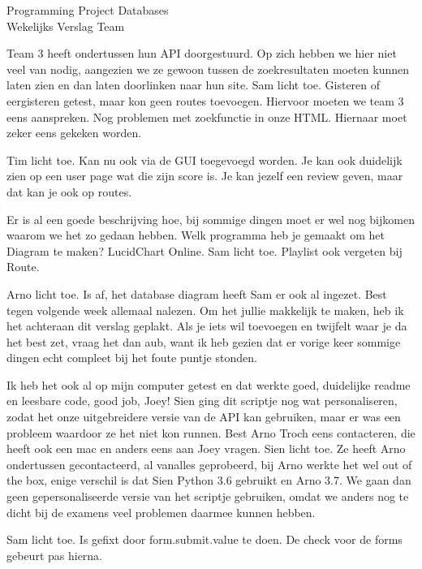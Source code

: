\documentclass{article}
\newcounter{team}
\begin{document}
\begin{Minutes}{Programming Project Databases \\ Wekelijks Verslag Team }

    Team 3 heeft ondertussen hun API doorgestuurd. Op zich hebben we hier niet veel van nodig, aangezien we ze gewoon tussen de zoekresultaten moeten kunnen laten zien en dan laten doorlinken naar hun site. Sam licht toe. Gisteren of eergisteren getest, maar kon geen routes toevoegen. Hiervoor moeten we team 3 eens aanspreken. Nog problemen met zoekfunctie in onze HTML. Hiernaar moet zeker eens gekeken worden.

        Tim licht toe. Kan nu ook via de GUI toegevoegd worden. Je kan ook duidelijk zien op een user page wat die zijn score is. Je kan jezelf een review geven, maar dat kan je ook op routes.

        Er is al een goede beschrijving hoe, bij sommige dingen moet er wel nog bijkomen waarom we het zo gedaan hebben. Welk programma heb je gemaakt om het Diagram te maken? LucidChart Online. Sam licht toe. Playlist ook vergeten bij Route.

        Arno licht toe. Is af, het database diagram heeft Sam er ook al ingezet. Best tegen volgende week allemaal nalezen. Om het jullie makkelijk te maken, heb ik het achteraan dit verslag geplakt. Als je iets wil toevoegen en twijfelt waar je da het best zet, vraag het dan aub, want ik heb gezien dat er vorige keer sommige dingen echt compleet bij het foute puntje stonden. %

        Ik heb het ook al op mijn computer getest en dat werkte goed, duidelijke readme en leesbare code, good job, Joey! Sien ging dit scriptje nog wat personaliseren, zodat het onze uitgebreidere versie van de API kan gebruiken, maar er was een probleem waardoor ze het niet kon runnen. Best Arno Troch eens contacteren, die heeft ook een mac en anders eens aan Joey vragen. Sien licht toe. Ze heeft Arno ondertussen gecontacteerd, al vanalles geprobeerd, bij Arno werkte het wel out of the box, enige verschil is dat Sien Python 3.6 gebruikt en Arno 3.7. We gaan dan geen gepersonaliseerde versie van het scriptje gebruiken, omdat we anders nog te dicht bij de examens veel problemen daarmee kunnen hebben.

        Sam licht toe. Is gefixt door form.submit.value te doen. De check voor de forms gebeurt pas hierna.


\end{Minutes}
\end{document}
